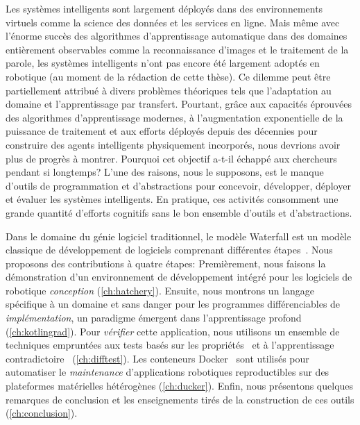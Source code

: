 Les systèmes intelligents sont largement déployés dans des environnements virtuels comme la science des données et les services en ligne. Mais même avec l'énorme succès des algorithmes d'apprentissage automatique dans des domaines entièrement observables comme la reconnaissance d'images et le traitement de la parole, les systèmes intelligents n'ont pas encore été largement adoptés en robotique (au moment de la rédaction de cette thèse). Ce dilemme peut être partiellement attribué à divers problèmes théoriques tels que l'adaptation au domaine et l'apprentissage par transfert. Pourtant, grâce aux capacités éprouvées des algorithmes d'apprentissage modernes, à l'augmentation exponentielle de la puissance de traitement et aux efforts déployés depuis des décennies pour construire des agents intelligents physiquement incorporés, nous devrions avoir plus de progrès à montrer. Pourquoi cet objectif a-t-il échappé aux chercheurs pendant si longtemps? L'une des raisons, nous le supposons, est le manque d'outils de programmation et d'abstractions pour concevoir, développer, déployer et évaluer les systèmes intelligents. En pratique, ces activités consomment une grande quantité d'efforts cognitifs sans le bon ensemble d'outils et d'abstractions.

Dans le domaine du génie logiciel traditionnel, le modèle Waterfall est un modèle classique de développement de logiciels comprenant différentes étapes~\citep{royce1987managing}. Nous proposons des contributions à quatre étapes: Premièrement, nous faisons la démonstration d'un environnement de développement intégré pour les logiciels de robotique \textit{conception} (\autoref{ch:hatchery}). Ensuite, nous montrons un langage spécifique à un domaine et sans danger pour les programmes différenciables de \textit{implémentation}, un paradigme émergent dans l'apprentissage profond (\autoref{ch:kotlingrad}). Pour \textit{vérifier} cette application, nous utilisons un ensemble de techniques empruntées aux tests basés sur les propriétés~\citep{fink1997property} et à l'apprentissage contradictoire~\citep{lowd2005adversarial} (\autoref{ch:difftest}). Les conteneurs Docker~\citep{merkel2014docker} sont utilisés pour automatiser le \textit{maintenance} d'applications robotiques reproductibles sur des plateformes matérielles hétérogènes (\autoref{ch:ducker}). Enfin, nous présentons quelques remarques de conclusion et les enseignements tirés de la construction de ces outils (\autoref{ch:conclusion}).


